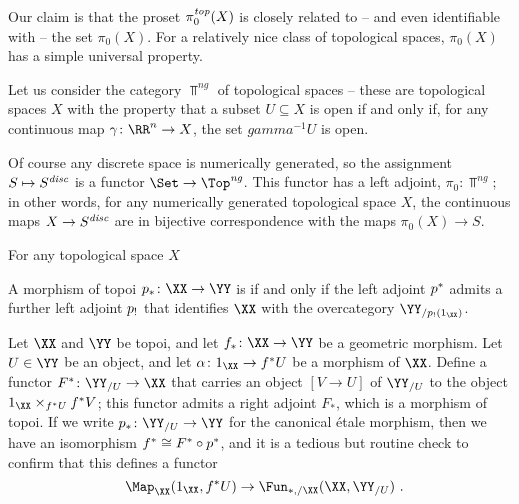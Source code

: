 Our claim is that the proset $ \pi_0^{\textit{top}}(X) $ is closely related to -- and even identifiable with -- the set $ \pi_0(X) $.
For a relatively nice class of topological spaces, $ \pi_0(X) $ has a simple universal property.

\begin{nul}
	Let us consider the category $ \Top^{\textit{ng}} $ of  topological spaces -- these are topological spaces $ X $ with the property that a subset $ U \subseteq X $ is open if and only if, for any continuous map $ \gamma \colon \RR^n \to X $, the set $ gamma^{-1} U $ is open.
	
	Of course any discrete space is numerically generated, so the assignment $ S \mapsto S^{\textit{disc}} $ is a functor $ \Set \to \Top^{\textit{ng}} $.
	This functor has a left adjoint, $ \pi_0 \colon \Top^{\textit{ng}} $;
	in other words, for any numerically generated topological space $ X $, the continuous maps $ X \to S^{\textit{disc}} $ are in bijective correspondence with the maps $ \pi_0(X) \to S $.
\end{nul}

For any  topological space $ X $ 

\begin{dfn}
	A morphism of topoi $ \plowerstar \colon \XX \to \YY $ is  if and only if the left adjoint $ p^{\ast} $ admits a further left adjoint $ p_{!} $ that identifies $ \XX $ with the overcategory $ \YY_{/\plowershriek(1_{\XX})} $.
\end{dfn}

\begin{cnstr}
	Let $ \XX $ and $ \YY $ be topoi, and let $ f_{\ast} \colon \XX \to \YY $ be a geometric morphism.
	Let $ U \in \YY $ be an object, and let $ \alpha \colon 1_{\XX} \to f^{\ast} U $ be a morphism of $ \XX $.
	Define a functor $ F^{\ast} \colon \YY_{/U} \to \XX $ that carries an object $ [ V \to U ] $ of $ \YY_{/U} $ to the object $ 1_{\XX} \times_{f^{\ast} U} f^{\ast} V $;
	this functor admits a right adjoint $ F_{\ast} $, which is a morphism of topoi.
	If we write $ \plowerstar \colon \YY_{/U} \to \YY $ for the canonical étale morphism, then we have an isomorphism $ f^{\ast} \cong F^{\ast} \circ p^{\ast} $, and
	it is a tedious but routine check to confirm that this defines a functor
	\[
		\Map_{\XX}(1_{\XX}, \fupperstar U) \to \Fun_{\ast,/\XX}(\XX, \YY_{/U}) \period
	\]
\end{cnstr}

